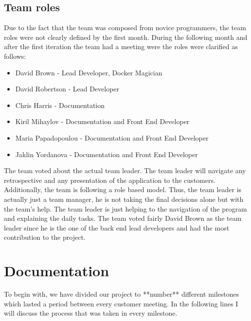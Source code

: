 \documentclass{l3proj}
\begin{document}
\subsection{Team roles}
\label{roles}

Due to the fact that the team was composed from novice programmers, the team roles were not clearly defined by the first month. During the following month and after the first iteration the team had a meeting were the roles were clarified as follows:

\begin{itemize}

\item David Brown - Lead Developer, Docker Magician

\item David Robertson - Lead Developer

\item Chris Harris - Documentation

\item Kiril Mihaylov - Documentation and Front End Developer

\item Maria Papadopoulou - Documentation and Front End Developer

\item Jaklin Yordanova - Documentation and Front End Developer

\end{itemize}
 
The team voted about the actual team leader. The team leader will navigate any retrospective and any presentation of the application to the customers. Additionally, the team is following a role based model. Thus, the team leader is actually just a team manager, he is not taking the final decisions alone but with the team's help. The team leader is just helping to the navigation of the program and explaining the daily tasks. The team voted fairly David Brown as the team leader since he is the one of the back end lead developers and had the most contribution to the project.


\section{Documentation}
\label{documentation}

To begin with, we have divided our project to **number** different milestones which lasted a period between every customer meeting. In the following lines I will discuss the process that was taken in every milestone.
\end{document}
